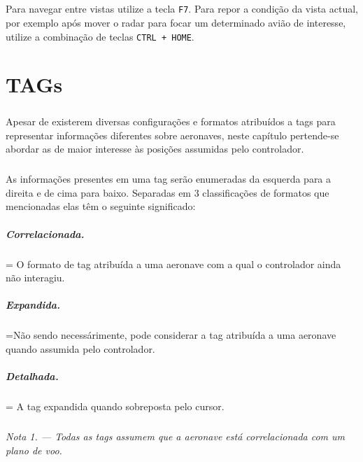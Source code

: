 \documentclass[10pt]{report}
\begin{document}
\paragraph*{} Para navegar entre vistas utilize a tecla \texttt{F7}. Para repor a condição da vista
actual, por exemplo após mover o radar para focar um determinado avião de interesse, utilize a
combinação de teclas \texttt{CTRL + HOME}.

\chapter{TAGs}
\label{cap:tags}

\paragraph*{} Apesar de existerem diversas configurações e formatos atribuídos a tags para
representar informações diferentes sobre aeronaves, neste capítulo pertende-se abordar as de maior
interesse às posições assumidas pelo controlador.

\paragraph*{} As informações presentes em uma tag serão enumeradas da esquerda para a direita e de
cima para baixo. Separadas em 3 classificações de formatos que mencionadas elas têm o seguinte
significado:

\paragraph*{\textit{Correlacionada.}}
\hangindent=\parindent
O formato de tag atribuída a uma aeronave com a qual o controlador ainda não interagiu.

\paragraph*{\textit{Expandida.}}
\hangindent=\parindent Não sendo necessárimente, pode considerar a tag atribuída a uma aeronave
quando assumida pelo controlador.

\paragraph*{\textit{Detalhada.}}
\hangindent=\parindent
A tag expandida quando sobreposta pelo cursor.

\paragraph*{}
\textit{Nota 1. — Todas as tags assumem que a aeronave está correlacionada com um plano de voo.}
\end{document}
